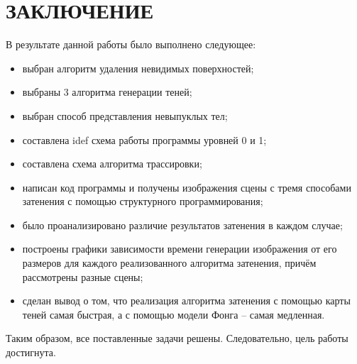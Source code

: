 \chapter*{ЗАКЛЮЧЕНИЕ}

В результате данной работы было выполнено следующее:
\begin{itemize}
    \item выбран алгоритм удаления невидимых поверхностей;
    \item выбраны 3 алгоритма генерации теней;
    \item выбран способ представления невыпуклых тел;
    \item составлена idef схема работы программы уровней 0 и 1;
    \item составлена схема алгоритма трассировки;
    \item
        написан код программы и получены изображения
        сцены с тремя способами затенения с помощью
        структурного программирования;
    \item было проанализировано различие результатов затенения в каждом случае;
    \item
        построены графики зависимости времени
        генерации изображения от его размеров для каждого
        реализованного алгоритма затенения, причём рассмотрены разные сцены;
    \item
        сделан вывод о том, что реализация алгоритма затенения
        с помощью карты теней самая быстрая,
        а с помощью модели Фонга -- самая медленная.
\end{itemize}
Таким образом, все поставленные задачи решены.
Следовательно, цель работы достигнута.